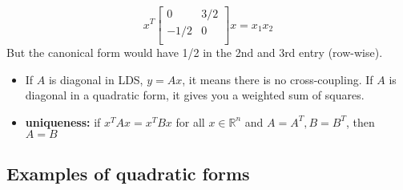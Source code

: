 \documentclass[10pt,letterpaper]{article}
\begin{document}
$$
x ^{T}
\begin{bmatrix}
     0 & 3/2 \\
  -1/2 & 0   \\
\end{bmatrix}
x= x_1 x_2
$$
But the canonical form would have 1/2 in the 2nd and 3rd entry (row-wise).
\begin{itemize}
\item If $A$ is diagonal in LDS, $y=Ax$, it means there is no cross-coupling. If $A$ is diagonal in a quadratic form, it gives you a weighted sum of squares.
\item \textbf{uniqueness:} if $x ^{T} Ax=x ^{T} Bx$ for all $x \in \mathbb{R}^{n}$ and $A=A^T, B = B ^{T}$, then $A=B$
\end{itemize}
\subsection{Examples of quadratic forms}
\label{sec-15_2}
\end{document}
